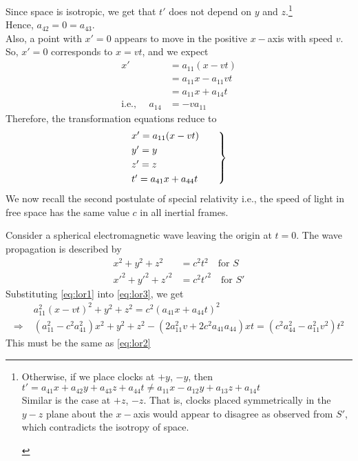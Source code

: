 \documentclass[../main-sheet.tex]{subfiles}
\begin{document}
Since space is isotropic, we get that \(t'\) does not depend on \(y \) and \(z\).\footnote{\begin{note}
    Otherwise, if we place clocks at \(+y \), \(-y \), then \(t'=a_{41 }x+a_{42 }y +a_{43  }z+a_{44}t \neq a_{11 }x-a_{12 }y +a_{13  }z+a_{14}t \)\\
    Similar is the case at \(+z \), \(-z \). That is, clocks placed symmetrically in the \(y-z\) plane about the \(x-\)axis would appear to disagree as observed from \(S' \), which contradicts the isotropy of space.
\end{note}}\\
Hence, \(a_{42}=0=a_{43}\).\\
Also, a point with \(x'=0\) appears to move in the positive \(x-\)axis with speed \(v \). \\
So, \(x'=0\) corresponds to \(x=vt \), and we expect
\begin{align*}
    x'&=a_{11}(x-vt)\\
    &=a_{11}x-a_{11}vt\\
    &=a_{11}x+a_{14}t\\
    \text{i.e., }\quad a_{14}&=-v a_{11}
\end{align*}
Therefore, the transformation equations reduce to 
\begin{equation}
    \begin{rcases}
        x'=a_{11 }(x-vt)\qquad\\
        y'=y\\
        z'=z\\
        t'=a_{41}x+a_{44}t\qquad
    \end{rcases}
    \label{eq:lor1}
\end{equation}
We now recall the second postulate of special relativity i.e., the speed of light in free space has the same value \(c \) in all inertial frames.

Consider a spherical electromagnetic wave leaving the origin at \(t=0\). The wave propagation is described by
\begin{align}
    x^2+y^2+z^2&=c^2t^2\quad\text{for }S \label{eq:lor2}\\
    x'^2+y'^2+z'^2&=c^2t'^2\quad\text{for }S' \label{eq:lor3}
\end{align}
Substituting \eqref{eq:lor1} into \eqref{eq:lor3}, we get
\begin{align*}
    & a_{11}^2(x-vt)^2+y^2+z^2=c^2\left( a_{41}x+a_{44}t \right)^2\\
    \Rightarrow\;& \left(a_{11}^2-c^2a_{41}^2\right)x^2+y^2+z^2-(2 a_{11}^2 v+2c^2a_{41}a_{44})xt=(c^2a_{44}^2-a_{11}^2v^2)t^2
\end{align*}
This must be the same as \eqref{eq:lor2}
\end{document}
